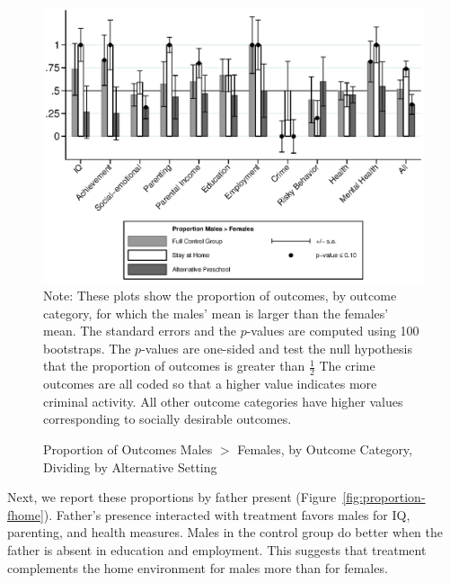 \begin{figure}[H]
\centering
\caption{Proportion of Outcomes Males $>$ Females, by Outcome Category, Dividing by Alternative Setting}
\label{fig:proportion-altpre}
	\includegraphics[width=\textwidth]{output/gendergaps-control-moderated-altpre}
\footnotesize \justify
Note: These plots show the proportion of outcomes, by outcome category, for which the males' mean is larger than the females' mean. The standard errors and the $p$-values are computed using 100 bootstraps. The $p$-values are one-sided and test the null hypothesis that the proportion of outcomes is greater than $\frac{1}{2}$ The crime outcomes are all coded so that a higher value indicates more criminal activity. All other outcome categories have higher values corresponding to socially desirable outcomes.
\end{figure}

Next, we report these proportions by father present (Figure~\ref{fig:proportion-fhome}). Father's presence interacted with treatment favors males for IQ, parenting, and health measures. Males in the control group do better when the father is absent in education and employment. This suggests that treatment complements the home environment for males more than for females.

